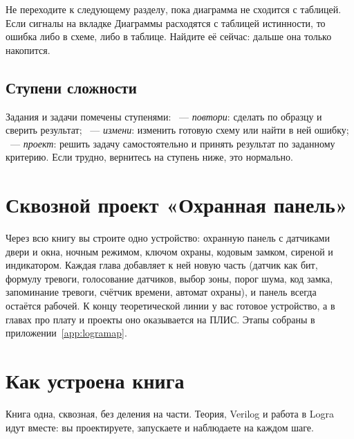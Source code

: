\begin{infobox}
Не переходите к следующему разделу, пока диаграмма не сходится с таблицей.
Если сигналы на вкладке Диаграммы расходятся с таблицей истинности, то
ошибка либо в схеме, либо в таблице. Найдите её сейчас: дальше она только
накопится.
\end{infobox}

\subsection*{Ступени сложности}

Задания и задачи помечены ступенями:
~--- \emph{повтори}: сделать по образцу и сверить результат;
~--- \emph{измени}: изменить готовую схему или найти в ней ошибку;
~--- \emph{проект}: решить задачу самостоятельно и принять результат по
заданному критерию. Если трудно, вернитесь на ступень ниже, это нормально.

\section*{Сквозной проект «Охранная панель»}

Через всю книгу вы строите одно устройство: охранную панель с датчиками двери и окна,
ночным режимом, ключом охраны, кодовым замком, сиреной и индикатором. Каждая
глава добавляет к ней новую часть (датчик как бит, формулу тревоги,
голосование датчиков, выбор зоны, порог шума, код замка, запоминание тревоги,
счётчик времени, автомат охраны), и панель всегда остаётся рабочей. К концу
теоретической линии у вас готовое устройство, а в главах про плату и проекты оно оказывается
на ПЛИС.
Этапы собраны в приложении~\ref{app:logramap}.

\section*{Как устроена книга}

Книга одна, сквозная, без деления на части. Теория, Verilog и работа в Logra
идут вместе: вы проектируете, запускаете и наблюдаете на каждом шаге.

